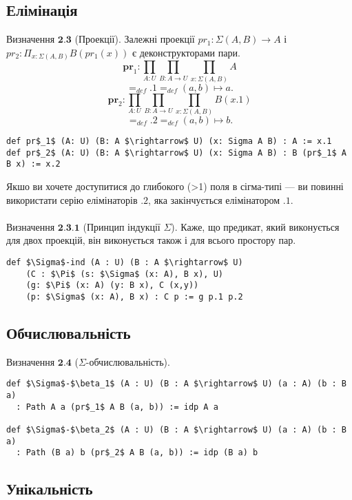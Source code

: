 \documentclass{article}
\theoremstyle{definition}
\begin{document}
\newpage

\subsection{Елімінація}

$\textbf{Визначення\ 2.3}$ (Проекції). Залежні проекції
$pr_{1}: \Sigma(A,B) \rightarrow A$ і
$pr_{2}: \Pi_{x: \Sigma(A,B)} B(pr_{1}(x))$ є деконструкторами пари.
$$
    \mathbf{pr}_1 : \prod_{A:U} \prod_{B:A \rightarrow U} \prod_{x: \Sigma(A,B)} A
$$
$$
    =_{def} .1 =_{def} (a,b) \mapsto a.
$$
$$
    \mathbf{pr}_2 : \prod_{A:U} \prod_{B:A \rightarrow U} \prod_{x: \Sigma(A,B)} B(x.1)
$$
$$
    =_{def} .2 =_{def} (a,b) \mapsto b.
$$
\begin{lstlisting}[mathescape=true]
def pr$_1$ (A: U) (B: A $\rightarrow$ U) (x: Sigma A B) : A := x.1
def pr$_2$ (A: U) (B: A $\rightarrow$ U) (x: Sigma A B) : B (pr$_1$ A B x) := x.2
\end{lstlisting}

Якшо ви хочете доступитися до глибокого (>1) поля в сігма-типі — ви повинні використати
серію елімінаторів $.2$, яка закінчується елімінатором $.1$.
\\
\\
\noindent $\textbf{Визначення\ 2.3.1}$ (Принцип індукції $\Sigma$). Каже, що
предикат, який виконується для двох проекцій, він виконується також і для
всього простору пар.

\begin{lstlisting}[mathescape=true]
def $\Sigma$-ind (A : U) (B : A $\rightarrow$ U)
    (C : $\Pi$ (s: $\Sigma$ (x: A), B x), U)
    (g: $\Pi$ (x: A) (y: B x), C (x,y))
    (p: $\Sigma$ (x: A), B x) : C p := g p.1 p.2
\end{lstlisting}

\subsection{Обчислювальність}

$\textbf{Визначення\ 2.4}$ ($\Sigma$-обчислювальність).
\begin{lstlisting}[mathescape=true]
def $\Sigma$-$\beta_1$ (A : U) (B : A $\rightarrow$ U) (a : A) (b : B a)
  : Path A a (pr$_1$ A B (a, b)) := idp A a

def $\Sigma$-$\beta_2$ (A : U) (B : A $\rightarrow$ U) (a : A) (b : B a)
  : Path (B a) b (pr$_2$ A B (a, b)) := idp (B a) b
\end{lstlisting}

\subsection{Унікальність}
\end{document}
